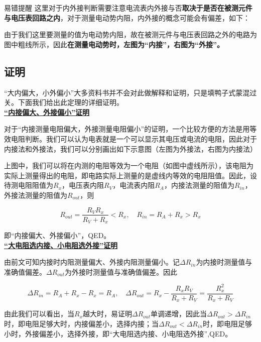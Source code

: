 \begin{mk}{易错提醒}{}
这里对于内外接判断需要注意电流表内外接与否\textbf{取决于是否在被测元件与电压表回路之内}，对于测量电动势内阻，内外接的概念可能会有偏差，如下：



由于我们这里要测量的值为电动势内阻，故在被测元件与电压表回路之外的电路为图中粗线所示，因此\textbf{在测量电动势时，左图为“内接”，右图为“外接”。}
\end{mk}

\subsection{证明}
“大内偏大，小外偏小”大多资料书并不会对此做解释和证明，只是填鸭子式蒙混过关。下面我们给出此定理的详细证明。
~\\

\noindent \uline{\textbf{“内接偏大、外接偏小”证明}}

对于“内接测量电阻偏大，外接测量电阻偏小”的证明，一个比较方便的方法是用等效电阻判断。我们可以认为电表就是一个可以显示其电压或电流的电阻，因此对于内接法和外接法，我们可以分别画出如下示意图（左图为外接法，右图为内接法）



上图中，我们可以将在内测的电阻等效为一个电阻（如图中虚线所示），该电阻为实际上测量得出的电阻，即电路实际上测量的是虚线内等效的电阻阻值。因此，设待测电阻阻值为$R_x$，电压表内阻$R_V$，电流表内阻$R_A$，内接法测量的阻值为$R_{in}$，外接法测量的阻值为$R_{out}$，则

\begin{equation}
\boxed{R_{out} = \frac{R_V R_x}{R_V + R_x} < R_x ,\quad R_{in} = R_A + R_x > R_x}
\end{equation}

即“内接偏大、外接偏小”，QED。
~\\

\noindent \uline{\textbf{“大电阻选内接、小电阻选外接”证明}}

由前文可知内接时内阻测量偏大、外接内阻测量偏小。记$\Delta R_{in}$为内接时测量值与准确值偏差。$\Delta R_{out}$为外接时测量值与准确值偏差。因此

$$\Delta R_{in} = R_A + R_x - R_x = R_A ,\quad \Delta R_{out} = R_x - \frac{R_x R_V}{R_x + R_V} = \frac{R_x^2}{R_x + R_V}$$

由此我们可以看出，当$R_x$越大时，易证明$\Delta R_{out}$单调递增，因此当$\Delta R_{out} > \Delta R_{in}$时，即电阻足够大时，内接偏差小，选择内接；当$\Delta R_{out} < \Delta R_{in}$时，即电阻足够小时，外接偏差小，选择外接，即“大电阻选内接、小电阻选外接”,QED。
~\\

